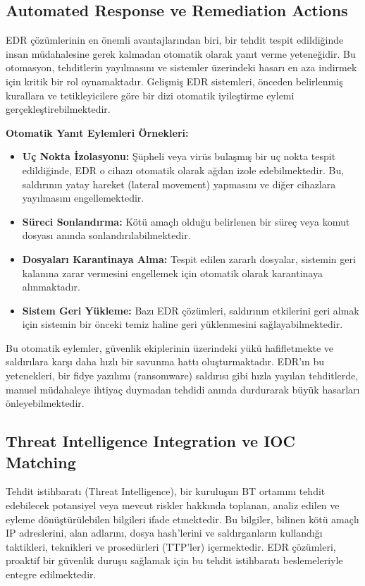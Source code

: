 \subsection{Automated Response ve Remediation Actions}

EDR çözümlerinin en önemli avantajlarından biri, bir tehdit tespit edildiğinde insan müdahalesine gerek kalmadan otomatik olarak yanıt verme yeteneğidir. Bu otomasyon, tehditlerin yayılmasını ve sistemler üzerindeki hasarı en aza indirmek için kritik bir rol oynamaktadır. Gelişmiş EDR sistemleri, önceden belirlenmiş kurallara ve tetikleyicilere göre bir dizi otomatik iyileştirme eylemi gerçekleştirebilmektedir.

\textbf{Otomatik Yanıt Eylemleri Örnekleri:}
\begin{itemize}
    \item \textbf{Uç Nokta İzolasyonu:} Şüpheli veya virüs bulaşmış bir uç nokta tespit edildiğinde, EDR o cihazı otomatik olarak ağdan izole edebilmektedir. Bu, saldırının yatay hareket (lateral movement) yapmasını ve diğer cihazlara yayılmasını engellemektedir.
    \item \textbf{Süreci Sonlandırma:} Kötü amaçlı olduğu belirlenen bir süreç veya komut dosyası anında sonlandırılabilmektedir.
    \item \textbf{Dosyaları Karantinaya Alma:} Tespit edilen zararlı dosyalar, sistemin geri kalanına zarar vermesini engellemek için otomatik olarak karantinaya alınmaktadır.
    \item \textbf{Sistem Geri Yükleme:} Bazı EDR çözümleri, saldırının etkilerini geri almak için sistemin bir önceki temiz haline geri yüklenmesini sağlayabilmektedir.
\end{itemize}

Bu otomatik eylemler, güvenlik ekiplerinin üzerindeki yükü hafifletmekte ve saldırılara karşı daha hızlı bir savunma hattı oluşturmaktadır. EDR'ın bu yetenekleri, bir fidye yazılımı (ransomware) saldırısı gibi hızla yayılan tehditlerde, manuel müdahaleye ihtiyaç duymadan tehdidi anında durdurarak büyük hasarları önleyebilmektedir.

\subsection{Threat Intelligence Integration ve IOC Matching}

Tehdit istihbaratı (Threat Intelligence), bir kuruluşun BT ortamını tehdit edebilecek potansiyel veya mevcut riskler hakkında toplanan, analiz edilen ve eyleme dönüştürülebilen bilgileri ifade etmektedir. Bu bilgiler, bilinen kötü amaçlı IP adreslerini, alan adlarını, dosya hash'lerini ve saldırganların kullandığı taktikleri, teknikleri ve prosedürleri (TTP'ler) içermektedir. EDR çözümleri, proaktif bir güvenlik duruşu sağlamak için bu tehdit istihbaratı beslemeleriyle entegre edilmektedir.

